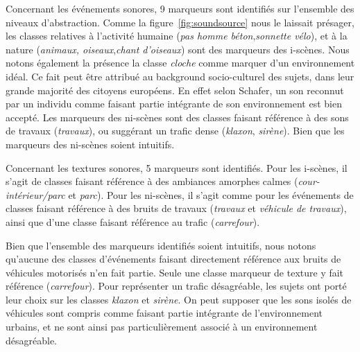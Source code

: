 Concernant les événements sonores, 9 marqueurs sont identifiés sur l'ensemble des niveaux d'abstraction. Comme la figure~\ref{fig:soundsource} nous le laissait présager, les classes relatives à l'activité humaine (\emph{pas homme béton},\emph{sonnette vélo}), et à la nature (\emph{animaux, oiseaux},\emph{chant d'oiseaux}) sont des marqueurs des i-scènes. Nous notons également la présence la classe \emph{cloche} comme marquer d'un environnement idéal. Ce fait peut être attribué au background socio-culturel des sujets, dans leur grande majorité des citoyens européens. En effet selon Schafer, un son reconnut par un individu comme faisant partie intégrante de son environnement est bien accepté. Les marqueurs des ni-scènes sont des classes faisant référence à des sons de travaux (\emph{travaux}), ou suggérant un trafic dense (\emph{klaxon}, \emph{sirène}). Bien que les marqueurs des ni-scènes soient intuitifs. 

Concernant les textures sonores, 5 marqueurs sont identifiés. Pour les i-scènes, il s'agit de classes faisant référence à des ambiances amorphes calmes (\emph{cour-intérieur/parc} et \emph{parc}). Pour les ni-scènes, il s'agit comme pour les événements de classes faisant référence à des bruits de travaux (\emph{travaux} et \emph{véhicule de travaux}), ainsi que d'une classe faisant référence au trafic (\emph{carrefour}).


Bien que l'ensemble des marqueurs identifiés soient intuitifs, nous notons qu'aucune des classes d'événements faisant directement référence aux bruits de véhicules motorisés n'en fait partie. Seule une classe marqueur de texture y fait référence (\emph{carrefour}). Pour représenter un trafic désagréable, les sujets ont porté leur choix sur les classes \emph{klaxon} et \emph{sirène}. On peut supposer que les sons isolés de véhicules sont compris comme faisant partie intégrante de l'environnement urbains, et ne sont ainsi pas particulièrement associé à un environnement désagréable. \\ 

 

